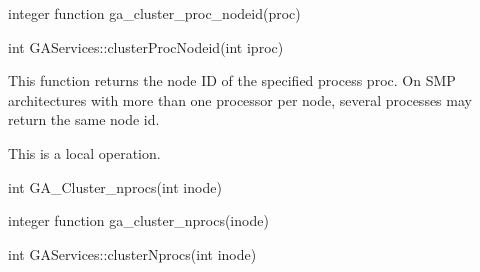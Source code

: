 \documentclass[12pt]{article}
\begin{document}
\begin{fapi}
\begin{fcode}
integer function ga_cluster_proc_nodeid(proc)
\end{fcode}
\begin{funcargs}
\end{funcargs}
\end{fapi}

\begin{cxxapi}
\begin{cxxcode}
int GAServices::clusterProcNodeid(int iproc)
\end{cxxcode}
\begin{funcargs}
\end{funcargs}
\end{cxxapi}
\local

\begin{desc}

This function returns the node ID of the specified process proc. 
On SMP architectures with more than one processor per node, several 
processes may return the same node id.

This is a  local operation.
\end{desc}


\begin{capi}
\begin{ccode}
int GA_Cluster_nprocs(int inode)
\end{ccode}
\begin{funcargs}
\end{funcargs}
\end{capi}

\begin{fapi}
\begin{fcode}
integer function ga_cluster_nprocs(inode)
\end{fcode}
\begin{funcargs}
\end{funcargs}
\end{fapi}

\begin{cxxapi}
\begin{cxxcode}
int GAServices::clusterNprocs(int inode)
\end{cxxcode}
\begin{funcargs}
\end{funcargs}
\end{cxxapi}
\end{document}
